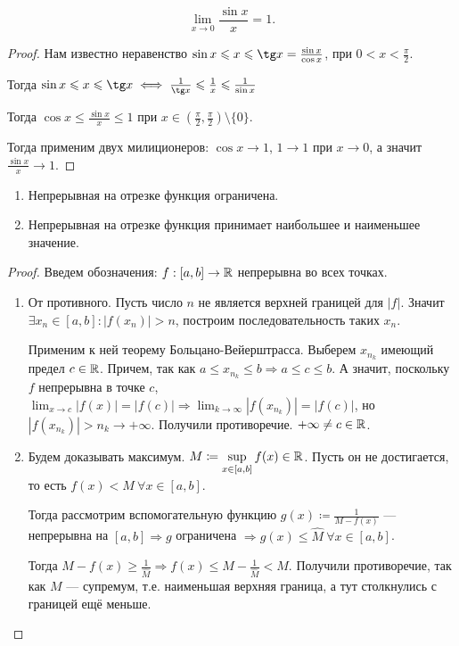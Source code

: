 \begin{theorem}
    \[
        \lim_{x\to 0} \frac{\sin x}{x} = 1
    .\] 
\end{theorem}
\begin{proof}
    Нам известно неравенство $\sin x \le x \le \tg x = \frac{\sin x}{\cos x}$, при $0 < x < \frac{\pi}{2}$. 

    Тогда $\sin x \le x \le \tg x \iff \frac{1}{\tg x} \le \frac{1}{x} \le \frac{1}{\sin x}$

    Тогда $\cos x \le \frac{\sin x}{x} \le 1$ при $x \in \left(\frac{\pi}{2}, \frac{\pi}{2}\right) \setminus \{0\}$.

    Тогда применим двух милиционеров: $\cos x \to 1$,  $1 \to 1$ при $x\to 0$, а значит  $\frac{\sin x}{x} \to 1$.
\end{proof}
\begin{theorem}
\slashn
\begin{enumerate}
    \item Непрерывная на отрезке функция ограничена.
    \item Непрерывная на отрезке функция принимает наибольшее и наименьшее значение.
\end{enumerate}
\end{theorem}
\begin{proof}
    Введем обозначения: $f: [a, b] \to \mathbb{R}$ непрерывна во всех точках.
    \begin{enumerate}
        \item От противного. Пусть число $n$ не является верхней границей для  $|f|$. Значит  $\exists x_n \in [a, b]\!: |f(x_n)| > n$, построим последовательность таких $x_n$.  

            Применим к ней теорему Больцано-Вейерштрасса. Выберем $x_{n_k}$ имеющий предел  $c \in \mathbb{R}$. Причем, так как  $a \le x_{n_k} \le b \Rightarrow a \le c \le b$. А значит, поскольку $f$ непрерывна в точке $c$, $\displaystyle \lim_{x\to c}|f(x)| = |f(c)| \Rightarrow \lim_{k \to \infty} |f(x_{n_k})| = |f(c)|$, но $|f(x_{n_k})| > n_k \to +\infty$. Получили противоречие.  $+\infty \neq c \in \mathbb{R}$.
        \item Будем доказывать максимум.  $\displaystyle M \coloneqq \sup_{x \in [a ,b]} f(x) \in \mathbb{R}$. Пусть он не достигается, то есть $f(x) < M\ \forall x \in [a, b]$. 

            Тогда рассмотрим вспомогательную функцию $g(x) \coloneqq \frac{1}{M - f(x)}$ --- непрерывна на $[a, b] \Rightarrow g$ ограничена  $\Rightarrow g(x) \le \widehat{M}\ \forall x \in [a, b]$.

            Тогда $M - f(x) \ge \frac{1}{\widehat{M}} \Rightarrow f(x) \le M - \frac{1}{\widehat{M}} < M$. Получили противоречие, так как $M$ --- супремум, т.е. наименьшая верхняя граница, а тут столкнулись с границей ещё меньше.
    \end{enumerate}
\end{proof}
